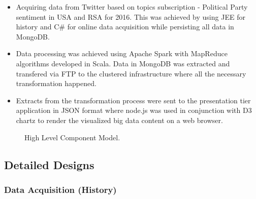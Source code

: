 \documentclass[12pt]{article} %
\begin{document}
		\begin{itemize}
			\item Acquiring data from Twitter based on topics subscription - Political Party sentiment in USA and RSA for 2016. This was achieved by using JEE for history and C\# for online data acquisition while persisting all data in MongoDB.
			\item Data processing was achieved using Apache Spark with MapReduce algorithms developed in Scala. Data in MongoDB was extracted and transfered via FTP to the clustered infrastructure where all the necessary transformation happened.
			\item Extracts from the transformation process were sent to the presentation tier application in JSON format where node.js was used in conjunction with D3 chartz to render the visualized big data content on a web browser.
		\end{itemize}
	
	
		\begin{figure}[H] %
			\caption{High Level Component Model.}
			\label{fig:speciation}
		\end{figure}
	
	\subsection{Detailed Designs}
	
	\subsubsection{Data Acquisition (History)}
	
\end{document}

